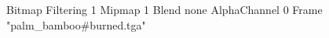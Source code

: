 {Bitmap
	{Filtering 1}
	{Mipmap 1}
	{Blend none}
	{AlphaChannel 0}
	{Frame "palm_bamboo#burned.tga"}
}
